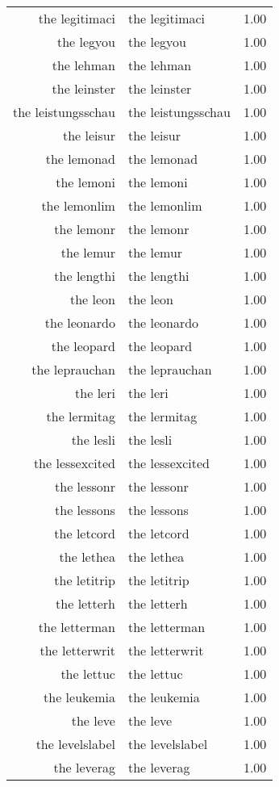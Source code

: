 \begin{table}[ht]
\begin{tabular}{rlr}
  the legitimaci & the legitimaci & 1.00 \\ 
  the legyou & the legyou & 1.00 \\ 
  the lehman & the lehman & 1.00 \\ 
  the leinster & the leinster & 1.00 \\ 
  the leistungsschau & the leistungsschau & 1.00 \\ 
  the leisur & the leisur & 1.00 \\ 
  the lemonad & the lemonad & 1.00 \\ 
  the lemoni & the lemoni & 1.00 \\ 
  the lemonlim & the lemonlim & 1.00 \\ 
  the lemonr & the lemonr & 1.00 \\ 
  the lemur & the lemur & 1.00 \\ 
  the lengthi & the lengthi & 1.00 \\ 
  the leon & the leon & 1.00 \\ 
  the leonardo & the leonardo & 1.00 \\ 
  the leopard & the leopard & 1.00 \\ 
  the leprauchan & the leprauchan & 1.00 \\ 
  the leri & the leri & 1.00 \\ 
  the lermitag & the lermitag & 1.00 \\ 
  the lesli & the lesli & 1.00 \\ 
  the lessexcited & the lessexcited & 1.00 \\ 
  the lessonr & the lessonr & 1.00 \\ 
  the lessons & the lessons & 1.00 \\ 
  the letcord & the letcord & 1.00 \\ 
  the lethea & the lethea & 1.00 \\ 
  the letitrip & the letitrip & 1.00 \\ 
  the letterh & the letterh & 1.00 \\ 
  the letterman & the letterman & 1.00 \\ 
  the letterwrit & the letterwrit & 1.00 \\ 
  the lettuc & the lettuc & 1.00 \\ 
  the leukemia & the leukemia & 1.00 \\ 
  the leve & the leve & 1.00 \\ 
  the levelslabel & the levelslabel & 1.00 \\ 
  the leverag & the leverag & 1.00 \\ 

\end{tabular}
\end{table}
